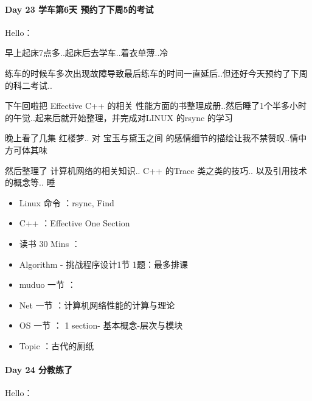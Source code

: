 \documentclass[UTF8,a4paper,8pt]{ctexart}
\begin{document}
 	 \paragraph{Day 23  学车第6天    \quad   预约了下周5的考试  }Hello：
 	 
	 	 早上起床7点多..起床后去学车..着衣单薄..冷
	 	 
	 	 练车的时候车多次出现故障导致最后练车的时间一直延后..但还好今天预约了下周的科二考试..
	 	 
	 	 下午回啦把 Effective C++ 的相关 性能方面的书整理成册..然后睡了1个半多小时的午觉..起来后就开始整理，并完成对LINUX 的rsync 的学习
	 	 
	 	 晚上看了几集 红楼梦.. 对 宝玉与黛玉之间 的感情细节的描绘让我不禁赞叹..情中方可体其味
	 	 
	 	 然后整理了 计算机网络的相关知识.. C++ 的Trace 类之类的技巧.. 以及引用技术的概念等.. 睡
	 	 
	 	 \begin{itemize}
	 	 	\item  \makebox[0pt][l]{$\square$}\raisebox{.15ex}{\hspace{0.1em}$\checkmark$} Linux 命令 ：rsync, Find
	 	 	\item  \makebox[0pt][l]{$\square$}\raisebox{.15ex}{\hspace{0.1em}$\checkmark$} C++ ：Effective One Section
	 	 	
	 	 	\item   读书  30 Mins	：	 	 
	 	 	\item  \makebox[0pt][l]{$\square$}\raisebox{.15ex}{\hspace{0.1em}$\checkmark$} Algorithm - 挑战程序设计1节 1题：最多排课 
	 	 	\item   muduo 一节 ：
	 	 	\item  \makebox[0pt][l]{$\square$}\raisebox{.15ex}{\hspace{0.1em}$\checkmark$} Net 一节 ：计算机网络性能的计算与理论
	 	 	\item  \makebox[0pt][l]{$\square$}\raisebox{.15ex}{\hspace{0.1em}$\checkmark$} OS  一节 ： 1 section- 基本概念-层次与模块
	 	 	
	 	 	\item  \makebox[0pt][l]{$\square$}\raisebox{.15ex}{\hspace{0.1em}$\checkmark$} Topic ：古代的厕纸
	 	 \end{itemize}
 	 \paragraph{Day 24  分教练了    \quad     }Hello：
 	 
\end{document}
